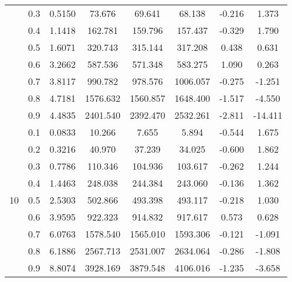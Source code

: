 \documentclass[11pt,a4paper]{report}
\begin{document}
\begin{longtable}{ | c | c || c | c | c | c | c | c | }
 & 0.3 & 0.5150 & 73.676 & 69.641 & 68.138 & -0.216 & 1.373 \\
 & 0.4 & 1.1418 & 162.781 & 159.796 & 157.437 & -0.329 & 1.790 \\
 & 0.5 & 1.6071 & 320.743 & 315.144 & 317.208 & 0.438 & 0.631 \\
 & 0.6 & 3.2662 & 587.536 & 571.348 & 583.275 & 1.090 & 0.263 \\
 & 0.7 & 3.8117 & 990.782 & 978.576 & 1006.057 & -0.275 & -1.251 \\
 & 0.8 & 4.7181 & 1576.632 & 1560.857 & 1648.400 & -1.517 & -4.550 \\
 & 0.9 & 4.4835 & 2401.540 & 2392.470 & 2532.261 & -2.811 & -14.411 \\
 \hline
\multirow{9}{*}{10} & 0.1 & 0.0833 & 10.266 & 7.655 & 5.894 & -0.544 & 1.675 \\
 & 0.2 & 0.3216 & 40.970 & 37.239 & 34.025 & -0.600 & 1.862 \\
 & 0.3 & 0.7786 & 110.346 & 104.936 & 103.617 & -0.262 & 1.244 \\
 & 0.4 & 1.4463 & 248.038 & 244.384 & 243.060 & -0.136 & 1.362 \\
 & 0.5 & 2.5303 & 502.866 & 493.398 & 493.117 & -0.218 & 1.030 \\
 & 0.6 & 3.9595 & 922.323 & 914.832 & 917.617 & 0.573 & 0.628 \\
 & 0.7 & 6.0763 & 1578.540 & 1565.010 & 1593.306 & -0.121 & -1.091 \\
 & 0.8 & 6.1886 & 2567.713 & 2531.007 & 2634.064 & -0.286 & -1.808 \\
 & 0.9 & 8.8074 & 3928.169 & 3879.548 & 4106.016 & -1.235 & -3.658 \\
 \hline
\hline
\end{longtable}
\end{document}
